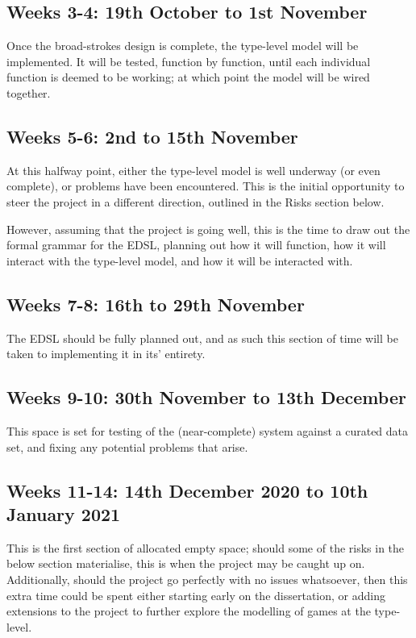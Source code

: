 \documentclass[12pt, a4paper]{scrartcl}
\begin{document}
\subsection{Weeks 3-4: 19th October to 1st November}

Once the broad-strokes design is complete, the type-level model will be implemented. It will be tested, function by function, until each individual function is deemed to be working; at which point the model will be wired together.

\subsection{Weeks 5-6: 2nd to 15th November}

At this halfway point, either the type-level model is well underway (or even complete), or problems have been encountered. This is the initial opportunity to steer the project in a different direction, outlined in the Risks section below.

However, assuming that the project is going well, this is the time to draw out the formal grammar for the EDSL, planning out how it will function, how it will interact with the type-level model, and how it will be interacted with.

\subsection{Weeks 7-8: 16th to 29th November}

The EDSL should be fully planned out, and as such this section of time will be taken to implementing it in its' entirety.

\subsection{Weeks 9-10: 30th November to 13th December}

This space is set for testing of the (near-complete) system against a curated data set, and fixing any potential problems that arise.

\subsection{Weeks 11-14: 14th December 2020 to 10th January 2021}

This is the first section of allocated empty space; should some of the risks in the below section materialise, this is when the project may be caught up on. Additionally, should the project go perfectly with no issues whatsoever, then this extra time could be spent either starting early on the dissertation, or adding extensions to the project to further explore the modelling of games at the type-level.
\end{document}
